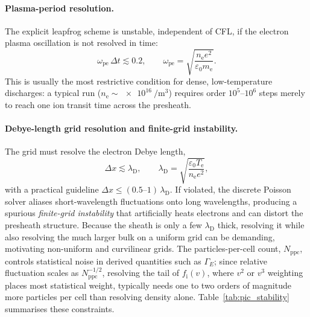 \paragraph{Plasma-period resolution.} The explicit leapfrog scheme is unstable, independent of CFL, if the electron plasma oscillation is not resolved in time:
\begin{equation}
\omega_{\mathrm{pe}}\,\Delta t \lesssim 0.2,
\qquad
\omega_{\mathrm{pe}} = \sqrt{\frac{n_{\mathrm{e}} e^{2}}{\varepsilon_{0} m_{\mathrm{e}}}}.
\label{eq:wpe_dt}
\end{equation}
This is usually the most restrictive condition for dense, low-temperature discharges: a typical run ($n_{\mathrm{e}}\sim\SI{e16}{\per\cubic\metre}$) requires order $10^{5}$--$10^{6}$ steps merely to reach one ion transit time across the presheath.

\paragraph{Debye-length grid resolution and finite-grid instability.} The grid must resolve the electron Debye length,
\begin{equation}
\Delta x \lesssim \lambda_{\mathrm{D}}, \qquad \lambda_{\mathrm{D}} = \sqrt{\frac{\varepsilon_{0} T_{\mathrm{e}}}{n_{\mathrm{e}} e^{2}}},
\end{equation}
with a practical guideline $\Delta x \le (0.5\text{--}1)\,\lambda_{\mathrm{D}}$. If violated, the discrete Poisson solver aliases short-wavelength fluctuations onto long wavelengths, producing a spurious \emph{finite-grid instability} that artificially heats electrons and can distort the presheath structure. Because the sheath is only a few $\lambda_{\mathrm{D}}$ thick, resolving it while also resolving the much larger bulk on a uniform grid can be demanding, motivating non-uniform and curvilinear grids. The particles-per-cell count, $N_{\mathrm{ppc}}$, controls statistical noise in derived quantities such as $\Gamma_{E}$; since relative fluctuation scales as $N_{\mathrm{ppc}}^{-1/2}$, resolving the tail of $f_{\mathrm{i}}(v)$, where $v^{2}$ or $v^{3}$ weighting places most statistical weight, typically needs one to two orders of magnitude more particles per cell than resolving density alone. Table~\ref{tab:pic_stability} summarises these constraints.


